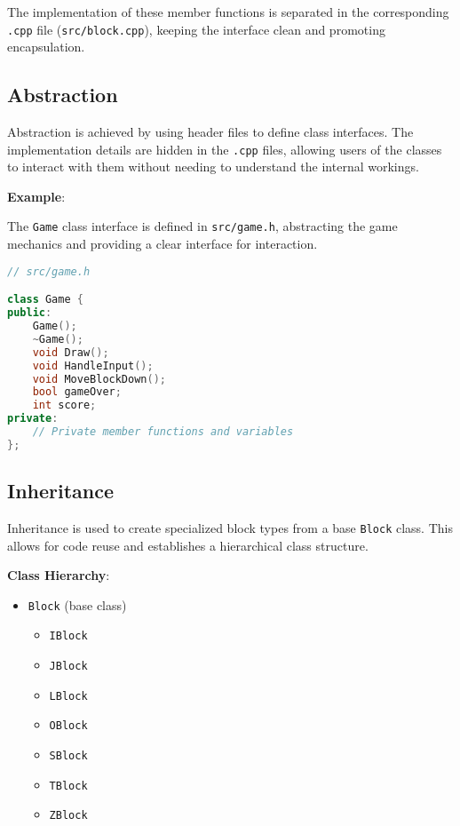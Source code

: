 \documentclass{article}
\begin{document}
The implementation of these member functions is separated in the corresponding \texttt{.cpp} file (\texttt{src/block.cpp}), keeping the interface clean and promoting encapsulation.

\subsection{Abstraction}

Abstraction is achieved by using header files to define class interfaces. The implementation details are hidden in the \texttt{.cpp} files, allowing users of the classes to interact with them without needing to understand the internal workings.

\textbf{Example}:

The \texttt{Game} class interface is defined in \texttt{src/game.h}, abstracting the game mechanics and providing a clear interface for interaction.

\begin{lstlisting}[language=C++]
// src/game.h

class Game {
public:
    Game();
    ~Game();
    void Draw();
    void HandleInput();
    void MoveBlockDown();
    bool gameOver;
    int score;
private:
    // Private member functions and variables
};
\end{lstlisting}

\subsection{Inheritance}

Inheritance is used to create specialized block types from a base \texttt{Block} class. This allows for code reuse and establishes a hierarchical class structure.

\textbf{Class Hierarchy}:

\begin{itemize}
    \item \texttt{Block} (base class)
    \begin{itemize}
        \item \texttt{IBlock}
        \item \texttt{JBlock}
        \item \texttt{LBlock}
        \item \texttt{OBlock}
        \item \texttt{SBlock}
        \item \texttt{TBlock}
        \item \texttt{ZBlock}
    \end{itemize}
\end{itemize}
\end{document}
